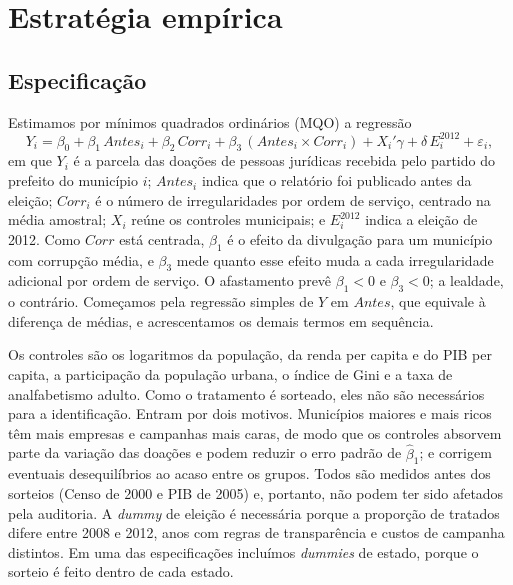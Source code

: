 \FloatBarrier
\section{Estratégia empírica}\label{sec:metodo}

\subsection{Especificação}

Estimamos por mínimos quadrados ordinários (MQO) a regressão
\begin{equation}\label{eq:mqo}
Y_i=\beta_0+\beta_1\,\mathit{Antes}_i+\beta_2\,\mathit{Corr}_i+\beta_3\,(\mathit{Antes}_i\times\mathit{Corr}_i)
+X_i'\gamma+\delta\,E^{2012}_i+\varepsilon_i ,
\end{equation}
em que $Y_i$ é a parcela das doações de pessoas jurídicas recebida pelo partido do prefeito do município
$i$; $\mathit{Antes}_i$ indica que o relatório foi publicado antes da eleição; $\mathit{Corr}_i$ é o número
de irregularidades por ordem de serviço, centrado na média amostral; $X_i$ reúne os controles municipais;
e $E^{2012}_i$ indica a eleição de 2012. Como $\mathit{Corr}$ está centrada, $\beta_1$ é o efeito da
divulgação para um município com corrupção média, e $\beta_3$ mede quanto esse efeito muda a cada
irregularidade adicional por ordem de serviço. O afastamento prevê $\beta_1<0$ e $\beta_3<0$; a lealdade, o
contrário. Começamos pela regressão simples de $Y$ em $\mathit{Antes}$, que equivale à diferença de médias,
e acrescentamos os demais termos em sequência.

Os controles são os logaritmos da população, da renda per capita e do PIB per capita, a participação da
população urbana, o índice de Gini e a taxa de analfabetismo adulto. Como o tratamento é sorteado, eles
não são necessários para a identificação. Entram por dois motivos. Municípios maiores e mais ricos têm
mais empresas e campanhas mais caras, de modo que os controles absorvem parte da variação das doações e
podem reduzir o erro padrão de $\hat\beta_1$; e corrigem eventuais desequilíbrios ao acaso entre os grupos.
Todos são medidos antes dos sorteios (Censo de 2000 e PIB de 2005) e, portanto, não podem ter sido
afetados pela auditoria. A \textit{dummy} de eleição é necessária porque a proporção de tratados difere
entre 2008 e 2012, anos com regras de transparência e custos de campanha distintos. Em uma das
especificações incluímos \textit{dummies} de estado, porque o sorteio é feito dentro de cada estado.

